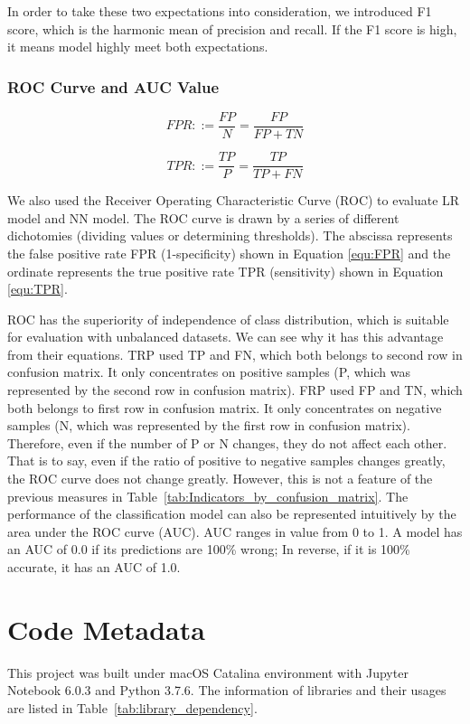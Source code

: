 \documentclass[final-report]{report-template}
\begin{document}
In order to take these two expectations into consideration, we introduced F1 score, which is the harmonic mean \citep{chhikara1988inverse} of precision and recall.
If the F1 score is high, it means model highly meet both expectations.

\subsubsection{ROC Curve and AUC Value}

\begin{equation}
    FPR ::= \frac{FP}{N} = \frac{FP}{FP+TN}  \label{equ:FPR}    
\end{equation}

\begin{equation}
    TPR ::= \frac{TP}{P} = \frac{TP}{TP+FN}  \label{equ:TPR}    
\end{equation}

We also used the Receiver Operating Characteristic Curve (ROC) to evaluate LR model and NN model. 
The ROC curve is drawn by a series of different dichotomies (dividing values or determining thresholds). 
The abscissa represents the false positive rate FPR (1-specificity) shown in Equation \eqref{equ:FPR} and the ordinate represents the true positive rate TPR (sensitivity) shown in Equation \eqref{equ:TPR}. 

ROC has the superiority of independence of class distribution, which is suitable for evaluation with unbalanced datasets.
We can see why it has this advantage from their equations. 
TRP used TP and FN, which both belongs to second row in confusion matrix. It only concentrates on positive samples (P, which was represented by the second row in confusion matrix). 
FRP used FP and TN, which both belongs to first row in confusion matrix. It only concentrates on negative samples (N, which was represented by the first row in confusion matrix). Therefore, even if the number of P or N changes, they do not affect each other.
That is to say, even if the ratio of positive to negative samples changes greatly, the ROC curve does not change greatly. However, this is not a feature of the previous measures in Table~\ref{tab:Indicators_by_confusion_matrix}. 
The performance of the classification model can also be represented intuitively by the area under the ROC curve (AUC). AUC ranges in value from 0 to 1. A model has an AUC of 0.0 if its predictions are 100\% wrong; In reverse, if it is 100\% accurate, it has an AUC of 1.0.

\section{Code Metadata}
\label{sec:code_metadata}
This project was built under macOS Catalina environment with Jupyter Notebook 6.0.3 and Python 3.7.6.
The information of libraries and their usages are listed in Table~\ref{tab:library_dependency}.
\end{document}
